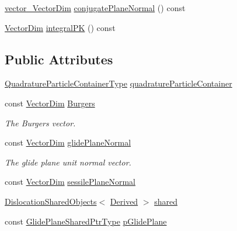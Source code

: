 \begin{DoxyCompactItemize}
\item 
\hyperlink{classmodel_1_1_dislocation_segment_abc79dbe2a844d424d597677d88324502}{vector\+\_\+\+Vector\+Dim} \hyperlink{classmodel_1_1_dislocation_segment_ab2f4c17e234a04bb76d9aae2ef3d559c}{conjugate\+Plane\+Normal} () const 
\item 
\hyperlink{_spline_enums_8h_ad5cfc23fc5c8569885db746e503c2e14}{Vector\+Dim} \hyperlink{classmodel_1_1_dislocation_segment_af269e6766aadff3f174a8ea4b724e471}{integral\+P\+K} () const 
\end{DoxyCompactItemize}
\subsection*{Public Attributes}
\begin{DoxyCompactItemize}
\item 
\hyperlink{classmodel_1_1_dislocation_segment_a86dd32b25521e4af71a4a8cb124abae4}{Quadrature\+Particle\+Container\+Type} \hyperlink{classmodel_1_1_dislocation_segment_abe35352697b2e7e397955be44cb2d4d1}{quadrature\+Particle\+Container}
\item 
const \hyperlink{_spline_enums_8h_ad5cfc23fc5c8569885db746e503c2e14}{Vector\+Dim} \hyperlink{classmodel_1_1_dislocation_segment_af43f4b8b5428167a0b2242bad632045e}{Burgers}
\begin{DoxyCompactList}\small\item\em The Burgers vector. \end{DoxyCompactList}\item 
const \hyperlink{_spline_enums_8h_ad5cfc23fc5c8569885db746e503c2e14}{Vector\+Dim} \hyperlink{classmodel_1_1_dislocation_segment_ae2dd6f1c724afc75fb90ab7b16e74ece}{glide\+Plane\+Normal}
\begin{DoxyCompactList}\small\item\em The glide plane unit normal vector. \end{DoxyCompactList}\item 
const \hyperlink{_spline_enums_8h_ad5cfc23fc5c8569885db746e503c2e14}{Vector\+Dim} \hyperlink{classmodel_1_1_dislocation_segment_abfce403c2a5e50bb69ca704168595dfd}{sessile\+Plane\+Normal}
\item 
\hyperlink{structmodel_1_1_dislocation_shared_objects}{Dislocation\+Shared\+Objects}$<$ \hyperlink{classmodel_1_1_dislocation_segment_a7767d69273160000e7597366ac1dc6e8}{Derived} $>$ \hyperlink{classmodel_1_1_dislocation_segment_af62dc8d8b77556c77499e16f677af359}{shared}
\item 
const \hyperlink{classmodel_1_1_dislocation_segment_a0563390515c7e0e65c8f949e545b1fc6}{Glide\+Plane\+Shared\+Ptr\+Type} \hyperlink{classmodel_1_1_dislocation_segment_abbe811c4cccf916decfdc05562f9d4c4}{p\+Glide\+Plane}

\end{DoxyCompactItemize}
